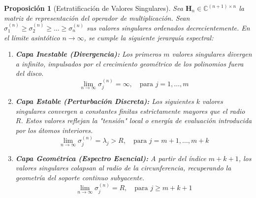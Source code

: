 \documentclass[12pt,a4paper]{article}
\newtheorem{proposicion}{Proposición}
\begin{document}
\begin{proposicion}[Estratificación de Valores Singulares]
Sea $\mathbf{H}_n \in \mathbb{C}^{(n+1) \times n}$ la matriz de representación del operador de multiplicación. Sean $\sigma_1^{(n)} \ge \sigma_2^{(n)} \ge \dots \ge \sigma_n^{(n)}$ sus valores singulares ordenados decrecientemente.
En el límite asintótico $n \to \infty$, se cumple la siguiente jerarquía espectral:

\begin{enumerate}
    \item \textbf{Capa Inestable (Divergencia):} Los primeros $m$ valores singulares divergen a infinito, impulsados por el crecimiento geométrico de los polinomios fuera del disco.
    $$ \lim_{n \to \infty} \sigma_j^{(n)} = \infty, \quad \text{para } j = 1, \dots, m $$
    
    \item \textbf{Capa Estable (Perturbación Discreta):} Los siguientes $k$ valores singulares convergen a constantes finitas estrictamente mayores que el radio $R$. Estos valores reflejan la "tensión" local o energía de evaluación introducida por los átomos interiores.
    $$ \lim_{n \to \infty} \sigma_j^{(n)} = \lambda_j > R, \quad \text{para } j = m+1, \dots, m+k $$
    
    \item \textbf{Capa Geométrica (Espectro Esencial):} A partir del índice $m+k+1$, los valores singulares colapsan al radio de la circunferencia, recuperando la geometría del soporte continuo subyacente.
    $$ \lim_{n \to \infty} \sigma_j^{(n)} = R, \quad \text{para } j \ge m+k+1 $$
\end{enumerate}
\end{proposicion}
\end{document}

